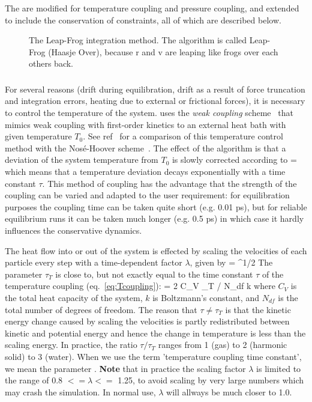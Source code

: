 The  are modified for temperature coupling
 and pressure coupling, and extended to include the conservation of
constraints, all of which are described below.
\begin {figure}
\centerline{}
\caption[The Leap-Frog integration method.]{The Leap-Frog integration method. The algorithm is called
Leap-Frog  (Haasje Over), because r and v are leaping
like  frogs over each others back.}
\label{fig:leapfrog}
\end {figure}

\subsubsection{}
For several reasons (drift during equilibration, drift as a result of
force truncation and integration errors, heating due to external or
frictional forces), it is necessary to control the temperature of the
system. \gromacs uses the {\em weak coupling} scheme~\cite{Berendsen84}
that mimics weak coupling with first-order kinetics to an external
heat bath with given temperature $T_0$. See ref~\cite{Berendsen91} for
a comparison of this temperature control method with the
Nos\'{e}-Hoover scheme~\cite{Nose84,Hoover85}. The effect of the algorithm is
that a deviation of the system temperature from $T_0$ is slowly
corrected according to
\beq
{} = 
\label{eq:Tcoupling}
\eeq
which means that a temperature deviation decays exponentially with a
time constant $\tau$.
This method of coupling has the advantage that the strength of the
coupling can be varied and adapted to the user requirement: for
equilibration purposes the coupling time can be taken quite short
(e.g. 0.01 ps), but for reliable equilibrium runs it can be taken much
longer (e.g. 0.5 ps) in which case it hardly influences the
conservative dynamics.
 
The heat flow into or out of the system is effected by scaling the
velocities of each particle every step with a time-dependent factor
$\lambda$, given by
\beq 
\lambda = ^{1/2}
\label{eq:lambda}
\eeq
The parameter $\tau_T$ is close to, but not exactly equal to the time constant
$\tau$ of the temperature coupling (eq.~\ref{eq:Tcoupling}):
\beq
\tau = 2 C_V \tau_T / N_{df} k
\eeq
where $C_V$ is the total heat capacity of the system, $k$ is Boltzmann's
constant, and $N_{df}$ is the total number of degrees of freedom. The
reason that $\tau \neq \tau_T$ is that the kinetic energy change
caused by scaling the velocities is partly redistributed between
kinetic and potential energy and hence the change in temperature is
less than the scaling energy.  In practice, the ratio $\tau / \tau_T$
ranges from 1 (gas) to 2 (harmonic solid) to 3 (water). When we use
the term 'temperature coupling time constant', we mean the parameter
.  
{\bf Note} that in practice the scaling factor $\lambda$ is limited to 
the range of 0.8 $<= \lambda <=$ 1.25, to avoid scaling by very large
numbers which may crash the simulation. In normal use, 
$\lambda$ will allways be much closer to 1.0.
  
